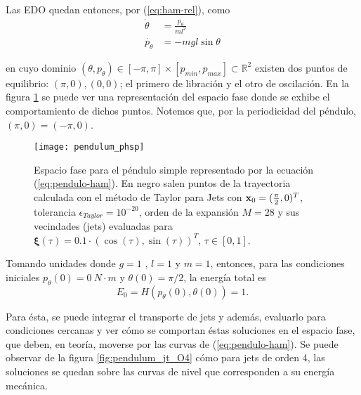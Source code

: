 Las EDO quedan entonces, por (\ref{eq:ham-rel}), como
\begin{align}
 \dot{\theta} &= \frac{p_{\theta}}{ml^2} \nonumber \\
 \dot{p_{\theta}} &= -mgl\sin{\theta} 
\label{eq:pendulo-ode}
\end{align}

en cuyo dominio $(\theta,p_{\theta}) \in [-\pi,\pi]\times[p_{min},p_{max}] \subset \mathbb{R}^2$ existen dos puntos de equilibrio: $(\pi,0), (0,0)$; el primero de libración y el otro de oscilación. En la figura \ref{fig:pendulum_pshp} se puede ver una representación del espacio fase donde se exhibe el comportamiento de dichos puntos. Notemos que, por la periodicidad del péndulo, $(\pi, 0) = (-\pi, 0)$.

\begin{figure}[h!]
 \centering
 \texttt{[image: pendulum\_phsp]}
 \caption{Espacio fase para el péndulo simple representado por la ecuación (\ref{eq:pendulo-ham}). En negro salen puntos de la trayectoria calculada con el método de Taylor para Jets con $\mathbf{x}_0 = (\frac{\pi}{2},0)^T$, tolerancia $\epsilon_{Taylor} = 10^{-20}$, orden de la expansión $M = 28$ y sus vecindades (jets) evaluadas para $\mathbf{\xi}(\tau) = 0.1\cdot \left( \cos(\tau), \sin(\tau) \right)^T$, $\tau \in [0,1]$.}
\label{fig:pendulum_pshp}
\end{figure}

Tomando unidades donde $g = 1 $ , $l=1$ y $m=1$,  entonces, para las condiciones iniciales $p_{\theta}(0) = 0 \ N \cdot m$ y $\theta(0) = \pi/2$, la energía total es 
\begin{equation*}
E_0 = H(p_{\theta}(0),\theta (0) ) = 1.
\end{equation*}

Para ésta, se puede integrar el transporte de jets y además, evaluarlo para condiciones cercanas y ver cómo se comportan éstas soluciones en el espacio fase, que deben, en teoría, moverse por las curvas de (\ref{eq:pendulo-ham}). Se puede observar de la figura \ref{fig:pendulum_jt_O4} cómo para jets de orden 4, las soluciones se quedan sobre las curvas de nivel que corresponden a su energía mecánica.


